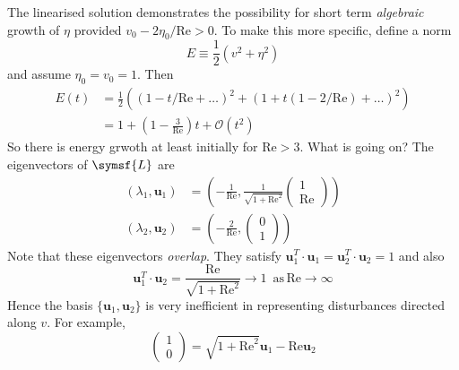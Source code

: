 \documentclass{jknotes}
\renewcommand{\u}{\symbf{u}}
\newcommand{\ReN}{\text{Re}}
\begin{document}
The linearised solution demonstrates the possibility for short term
\emph{algebraic} growth of $\eta$ provided $v_0 - 2\eta_0/\ReN > 0$. To make
this more specific, define a norm
\begin{equation}
	E \equiv \frac{1}{2}\left(v^2 + \eta^2\right)
\end{equation}
and assume $\eta_0 = v_0 =1$. Then
\begin{align}
	E(t) &= \frac{1}{2}\left((1-t/\ReN + \dots)^2 + (1+t(1-2/\ReN) +
	\dots)^2\right) \\
		 &= 1 + \left(1-\frac{3}{\ReN}\right) t + \mathcal{O}(t^2)
\end{align}
So there is energy grwoth at least initially for $\ReN > 3$. What is going on?
The eigenvectors of $\symsf{L}$ are
\begin{align}
	(\lambda_1, \u_1) &= (-\frac{1}{\ReN},
	\frac{1}{\sqrt{1+\ReN^2}}\begin{pmatrix} 1 \\ \ReN \end{pmatrix} ) \\
	(\lambda_2, \u_2) &= (-\frac{2}{\ReN},
	\begin{pmatrix} 0 \\ 1\end{pmatrix} )
\end{align}
Note that these eigenvectors \emph{overlap}. They satisfy $\u_1^T \cdot \u_1 =
\u_2^T \cdot \u_2 = 1$ and also
\begin{equation}
	\u_1^T \cdot \u_2 = \frac{\ReN}{\sqrt{1+\ReN^2}} \to 1
	\,\,\,\text{as}\,\ReN \to \infty
\end{equation}
Hence the basis $\{\u_1,\u_2\}$ is very inefficient in representing
disturbances directed along $v$. For example,
\begin{equation}
	\begin{pmatrix} 1 \\ 0 \end{pmatrix} =
	\sqrt{1+\ReN^2}\u_1 - \ReN \u_2
\end{equation}
\begin{center}
\end{center}
\end{document}
